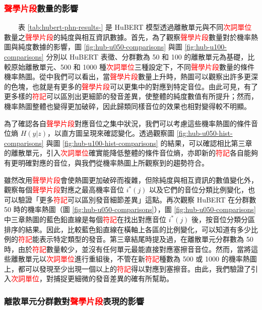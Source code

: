 \subsubsection{\textcolor{red}{聲學片段}數量的影響}

　　表 \ref{tab:hubert-phn-results-} 是 HuBERT 模型透過離散單元與不同\textcolor{red}{次詞單位}數量之\textcolor{red}{聲學片段}的純度與相互資訊數據。首先，為了觀察\textcolor{red}{聲學片段}數量對於機率熱圖與純度數據的影響，圖 \ref{fig:hub-u050-comparisons} 與圖 \ref{fig:hub-u100-comparisons} 分別以 HuBERT 表徵、分群數為 50 和 100 的離散單元為基礎，比較原始離散單元、500 和 1000 種\textcolor{red}{次詞單位}三種設定下，不同\textcolor{red}{聲學片段}數量的條件機率熱圖。從中我們可以看出，當\textcolor{red}{聲學片段}數量上升時，熱圖可以觀察出許多更深的色塊，也就是有更多的\textcolor{red}{聲學片段}可以更集中的對應到特定音位。由此可見，有了更多樣的\textcolor{red}{符記}可以區別出更細節的發音差異，使整體的純度數值有所提升；然而，機率熱圖整體也變得更加破碎，因此歸類同樣音位的效果也相對變得較不明顯。

        為了確認各自\textcolor{red}{聲學片段}對應音位之集中狀況，我們可以考慮這些機率熱圖的條件音位熵 $H(y|z)$，以直方圖呈現來確認變化。透過觀察圖 \ref{fig:hub-u050-hist-comparisons} 與圖 \ref{fig:hub-u100-hist-comparisons} 的結果，可以確認相比第三章的離散單元，引入\textcolor{red}{次詞單位}確實能降低整體的條件音位熵，亦即新的\textcolor{red}{符記}各自能夠有更明確對應的音位，與我們從機率熱圖上所觀察到的趨勢符合。

        雖然改用\textcolor{red}{聲學片段}會使熱圖更加破碎而複雜，但除純度與相互資訊的數值變化外，觀察每個\textcolor{red}{聲學片段}對應之最高機率音位 $i^*(j)$ 以及它們的音位分類比例變化，也可以驗證「更多\textcolor{red}{符記}可以區別發音細節差異」這點。再次觀察 HuBERT 在分群數 50 時的機率熱圖（圖 \ref{fig:hub-u050-comparisons}），圖 \ref{fig:hub-u050-comparisons} 中三章熱圖的藍色鉛直線是每個\textcolor{red}{符記}在找出對應音位 $i^*(j)$ 後，按音位分類分區排序的結果。因此，比較藍色鉛直線在橫軸上各區的比例變化，可以知道有多少比例的\textcolor{red}{符記}能表示特定類型的發音。第三章結尾時提及過，在離散單元分群數為 50 時，由於\textcolor{red}{符記}數量較少，並沒有任何單元最能直接對應塞擦音音位。然而，當將這些離散單元以\textcolor{red}{次詞單位}進行重組後，不管在新\textcolor{red}{符記}種數為 500 或 1000 的機率熱圖上，都可以發現至少出現一個以上的\textcolor{red}{符記}得以對應到塞擦音。由此，我們驗證了引入\textcolor{red}{次詞單位}，對捕捉更細微的發音差異的確有所幫助。

\subsubsection{離散單元分群數對\textcolor{red}{聲學片段}表現的影響}

